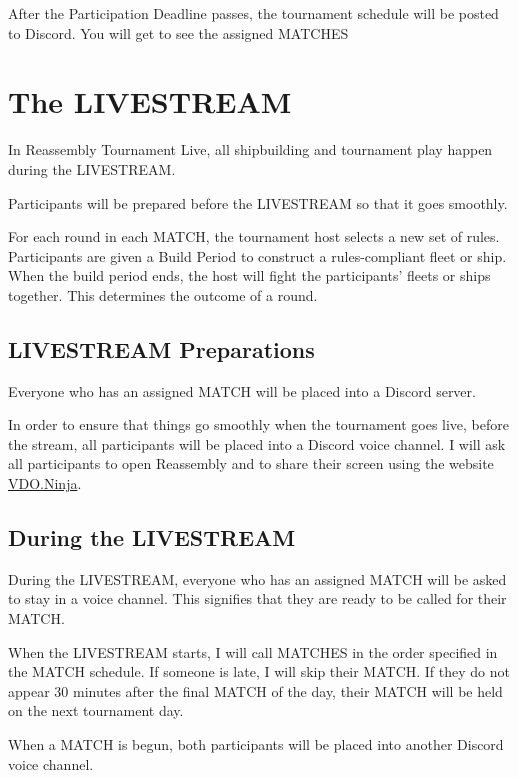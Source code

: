 \documentclass[11pt]{article}
\newcommand{\RTL}{Reassembly Tournament Live}
\newcommand{\termemph}[1]{\uppercase{#1}}
\begin{document}
After the Participation Deadline passes, the tournament schedule will be posted to Discord.
You will get to see the assigned \termemph{matches} 

\section{The \termemph{Livestream}}
In \RTL{}, all shipbuilding and tournament play happen during the \termemph{Livestream}.

Participants will be prepared before the \termemph{Livestream} so that it goes smoothly.

For each round in each \termemph{match}, the tournament host selects a new set of rules. Participants are
given a Build Period to construct a rules-compliant fleet or ship. When the build period ends,
the host will fight the participants' fleets or ships together. This determines the outcome of
a round.

\subsection{\termemph{Livestream} Preparations}
Everyone who has an assigned \termemph{match} will be placed into a Discord server. 

In order to ensure that things go smoothly when the tournament goes live, before the stream, 
all participants will be placed into a Discord voice channel. I will ask all participants to open 
Reassembly and to share their screen using the website \href{https://vdo.ninja/}{VDO.Ninja}.

\subsection{During the \termemph{Livestream}}
During the \termemph{Livestream}, everyone who has an assigned \termemph{match} will be asked to stay in a voice
channel. This signifies that they are ready to be called for their \termemph{match}. 

When the \termemph{Livestream} starts, I will call \termemph{matches} in the order specified in the \termemph{match} schedule.
If someone is late, I will skip their \termemph{match}. If they do not appear
30 minutes after the final \termemph{match} of the day, their \termemph{match} will be held on the next tournament day.

When a \termemph{match} is begun, both participants will be placed into another Discord voice channel.
\end{document}

